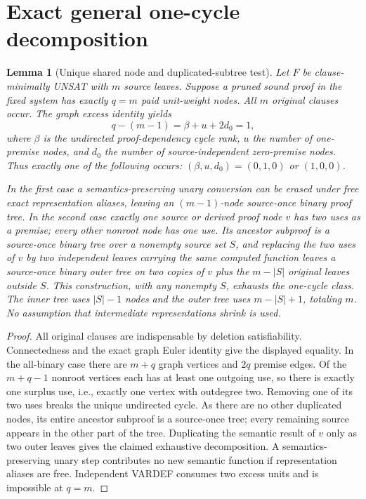 \documentclass[11pt]{article}
\newtheorem{lemma}{Lemma}
\begin{document}
\section*{Exact general one-cycle decomposition}
\begin{lemma}[Unique shared node and duplicated-subtree test]
Let $F$ be clause-minimally UNSAT with $m$ source leaves. Suppose a pruned sound proof in the fixed system has exactly $q=m$ paid unit-weight nodes. All $m$ original clauses occur. The graph excess identity yields
\[
q-(m-1)=\beta+u+2d_0=1,
\]
where $\beta$ is the undirected proof-dependency cycle rank, $u$ the number of one-premise nodes, and $d_0$ the number of source-independent zero-premise nodes. Thus exactly one of the following occurs: $(\beta,u,d_0)=(0,1,0)$ or $(1,0,0)$.

In the first case a semantics-preserving unary conversion can be erased under free exact representation aliases, leaving an $(m-1)$-node source-once binary proof tree. In the second case exactly one source or derived proof node $v$ has two uses as a premise; every other nonroot node has one use. Its ancestor subproof is a source-once binary tree over a nonempty source set $S$, and replacing the two uses of $v$ by two independent \emph{leaves carrying the same computed function} leaves a source-once binary outer tree on two copies of $v$ plus the $m-|S|$ original leaves outside $S$. This construction, with any nonempty $S$, exhausts the one-cycle class. The inner tree uses $|S|-1$ nodes and the outer tree uses $m-|S|+1$, totaling $m$. No assumption that intermediate representations shrink is used.
\end{lemma}
\begin{proof}
All original clauses are indispensable by deletion satisfiability. Connectedness and the exact graph Euler identity give the displayed equality. In the all-binary case there are $m+q$ graph vertices and $2q$ premise edges. Of the $m+q-1$ nonroot vertices each has at least one outgoing use, so there is exactly one surplus use, i.e., exactly one vertex with outdegree two. Removing one of its two uses breaks the unique undirected cycle. As there are no other duplicated nodes, its entire ancestor subproof is a source-once tree; every remaining source appears in the other part of the tree. Duplicating the semantic result of $v$ only as two outer leaves gives the claimed exhaustive decomposition. A semantics-preserving unary step contributes no new semantic function if representation aliases are free. Independent VARDEF consumes two excess units and is impossible at $q=m$.
\end{proof}
\end{document}
